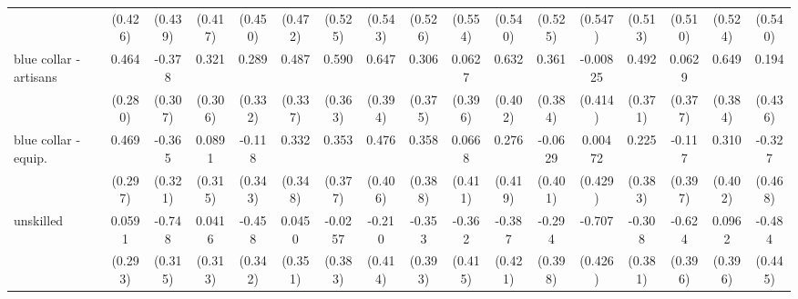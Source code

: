 {\begin{tabular}{l*{16}{c}}
                    &     (0.426)         &     (0.439)         &     (0.417)         &     (0.450)         &     (0.472)         &     (0.525)         &     (0.543)         &     (0.526)         &     (0.554)         &     (0.540)         &     (0.525)         &     (0.547)         &     (0.513)         &     (0.510)         &     (0.524)         &     (0.540)         \\
[1em]
blue collar - artisans&       0.464         &      -0.378         &       0.321         &       0.289         &       0.487         &       0.590         &       0.647         &       0.306         &      0.0627         &       0.632         &       0.361         &    -0.00825         &       0.492         &      0.0629         &       0.649         &       0.194         \\
                    &     (0.280)         &     (0.307)         &     (0.306)         &     (0.332)         &     (0.337)         &     (0.363)         &     (0.394)         &     (0.375)         &     (0.396)         &     (0.402)         &     (0.384)         &     (0.414)         &     (0.371)         &     (0.377)         &     (0.384)         &     (0.436)         \\
[1em]
blue collar - equip.&       0.469         &      -0.365         &      0.0891         &      -0.118         &       0.332         &       0.353         &       0.476         &       0.358         &      0.0668         &       0.276         &     -0.0629         &     0.00472         &       0.225         &      -0.117         &       0.310         &      -0.327         \\
                    &     (0.297)         &     (0.321)         &     (0.315)         &     (0.343)         &     (0.348)         &     (0.377)         &     (0.406)         &     (0.388)         &     (0.411)         &     (0.419)         &     (0.401)         &     (0.429)         &     (0.383)         &     (0.397)         &     (0.402)         &     (0.468)         \\
[1em]
unskilled           &      0.0591         &      -0.748\sym{*}  &      0.0416         &      -0.458         &      0.0450         &     -0.0257         &      -0.210         &      -0.353         &      -0.362         &      -0.387         &      -0.294         &      -0.707         &      -0.308         &      -0.624         &      0.0962         &      -0.484         \\
                    &     (0.293)         &     (0.315)         &     (0.313)         &     (0.342)         &     (0.351)         &     (0.383)         &     (0.414)         &     (0.393)         &     (0.415)         &     (0.421)         &     (0.398)         &     (0.426)         &     (0.381)         &     (0.396)         &     (0.396)         &     (0.445)         \\

\end{tabular}}
